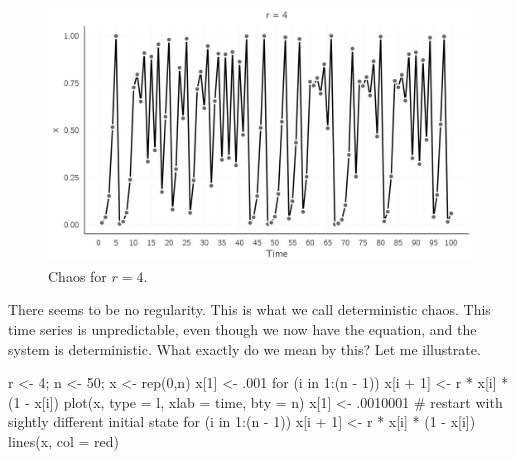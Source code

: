 \documentclass[
  a4paper,
  DIV=11,
  numbers=noendperiod,
  oneside]{scrreprt}
\newenvironment{Shaded}{\begin{snugshade}}{\end{snugshade}}
\newcommand{\AttributeTok}[1]{\textcolor[rgb]{0.40,0.45,0.13}{#1}}
\newcommand{\CommentTok}[1]{\textcolor[rgb]{0.37,0.37,0.37}{#1}}
\newcommand{\ControlFlowTok}[1]{\textcolor[rgb]{0.00,0.23,0.31}{#1}}
\newcommand{\DecValTok}[1]{\textcolor[rgb]{0.68,0.00,0.00}{#1}}
\newcommand{\FunctionTok}[1]{\textcolor[rgb]{0.28,0.35,0.67}{#1}}
\newcommand{\NormalTok}[1]{\textcolor[rgb]{0.00,0.23,0.31}{#1}}
\newcommand{\OtherTok}[1]{\textcolor[rgb]{0.00,0.23,0.31}{#1}}
\newcommand{\SpecialCharTok}[1]{\textcolor[rgb]{0.37,0.37,0.37}{#1}}
\newcommand{\StringTok}[1]{\textcolor[rgb]{0.13,0.47,0.30}{#1}}
\begin{document}
\begin{figure}

{\centering \includegraphics{media/ch2/fig-ch2-img5.jpg}

}

\caption{\label{fig-ch2-img5}Chaos for \(r = 4\).}

\end{figure}

There seems to be no regularity. This is what we call deterministic
chaos. This time series is unpredictable, even though we now have the
equation, and the system is deterministic. What exactly do we mean by
this? Let me illustrate.

\begin{Shaded}
\begin{Highlighting}[]
\NormalTok{r }\OtherTok{\textless{}{-}} \DecValTok{4}\NormalTok{;  n }\OtherTok{\textless{}{-}} \DecValTok{50}\NormalTok{; x }\OtherTok{\textless{}{-}} \FunctionTok{rep}\NormalTok{(}\DecValTok{0}\NormalTok{,n)}
\NormalTok{x[}\DecValTok{1}\NormalTok{] }\OtherTok{\textless{}{-}}\NormalTok{ .}\DecValTok{001}
\ControlFlowTok{for}\NormalTok{ (i }\ControlFlowTok{in} \DecValTok{1}\SpecialCharTok{:}\NormalTok{(n }\SpecialCharTok{{-}} \DecValTok{1}\NormalTok{))}
\NormalTok{  x[i }\SpecialCharTok{+} \DecValTok{1}\NormalTok{] }\OtherTok{\textless{}{-}}\NormalTok{ r }\SpecialCharTok{*}\NormalTok{ x[i] }\SpecialCharTok{*}\NormalTok{ (}\DecValTok{1} \SpecialCharTok{{-}}\NormalTok{ x[i])}
\FunctionTok{plot}\NormalTok{(x, }\AttributeTok{type =} \StringTok{\textquotesingle{}l\textquotesingle{}}\NormalTok{, }\AttributeTok{xlab =} \StringTok{\textquotesingle{}time\textquotesingle{}}\NormalTok{, }\AttributeTok{bty =} \StringTok{\textquotesingle{}n\textquotesingle{}}\NormalTok{)}
\NormalTok{x[}\DecValTok{1}\NormalTok{] }\OtherTok{\textless{}{-}}\NormalTok{ .}\DecValTok{0010001}
\CommentTok{\# restart with sightly different initial state}
\ControlFlowTok{for}\NormalTok{ (i }\ControlFlowTok{in} \DecValTok{1}\SpecialCharTok{:}\NormalTok{(n }\SpecialCharTok{{-}} \DecValTok{1}\NormalTok{))}
\NormalTok{  x[i }\SpecialCharTok{+} \DecValTok{1}\NormalTok{] }\OtherTok{\textless{}{-}}\NormalTok{ r }\SpecialCharTok{*}\NormalTok{ x[i] }\SpecialCharTok{*}\NormalTok{ (}\DecValTok{1} \SpecialCharTok{{-}}\NormalTok{ x[i])}
\FunctionTok{lines}\NormalTok{(x, }\AttributeTok{col =} \StringTok{\textquotesingle{}red\textquotesingle{}}\NormalTok{)}
\end{Highlighting}
\end{Shaded}
\end{document}
